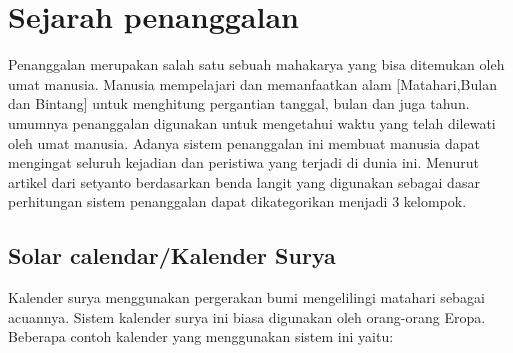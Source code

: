 

\section{Sejarah penanggalan}

  Penanggalan merupakan salah satu sebuah mahakarya yang bisa ditemukan oleh umat manusia. Manusia mempelajari dan memanfaatkan alam [Matahari,Bulan dan Bintang] untuk menghitung pergantian tanggal, bulan dan juga tahun.
umumnya penanggalan digunakan untuk mengetahui waktu yang telah dilewati oleh umat manusia. Adanya sistem penanggalan ini membuat manusia dapat mengingat seluruh kejadian dan peristiwa yang terjadi di dunia ini.
Menurut artikel dari setyanto berdasarkan benda langit yang digunakan sebagai dasar perhitungan sistem penanggalan dapat dikategorikan menjadi 3 kelompok\cite{setyanto2015kriteria}.


  \subsection{Solar calendar/Kalender Surya}
    Kalender surya menggunakan pergerakan bumi mengelilingi matahari sebagai acuannya. Sistem kalender surya ini biasa digunakan oleh orang-orang Eropa. Beberapa contoh kalender yang menggunakan sistem ini yaitu:

